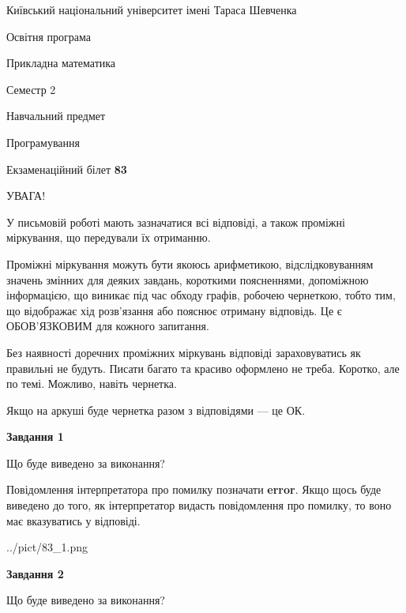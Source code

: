 \documentclass[12pt, ukrainian]{article}
\begin{document}
{{\begin {small}\par
{ \center  Київський національний університет імені Тараса Шевченка \par}
{\parbox {5 cm}{Освітня програма \hfill}{\parbox {7 cm}{Прикладна математика \hfill}}\parbox {6 cm}{\hfill Семестр 2}}\par
{\parbox {5 cm} {Навчальний предмет \hfill}\parbox {7 cm}{Програмування \hfill}\parbox {6cm}{\hfill}\par}\vspace{-7pt} \end{small}}{\center Екзаменаційний білет \No \textbf
{ 83 }\par}}
{
\begin {large}
УВАГА!

У письмовій роботі мають зазначатися всі відповіді, а також проміжні міркування, що передували їх отриманню.

Проміжні міркування можуть бути якоюсь арифметикою, відслідковуванням зна\-чень змінних для деяких завдань,
короткими поясненнями, допоміжною інформацією, що виникає під час обходу графів, робочею чернеткою,
тобто тим, що відображає хід розв’язання або пояснює отриману відповідь.
Це є ОБОВ’ЯЗКОВИМ для кожного запитання.

Без наявності доречних проміжних міркувань відповіді зараховуватись як правиль\-ні не будуть.
Писати багато та красиво оформлено не треба. Коротко, але по темі. Можли\-во, навіть чернетка.

Якщо на аркуші буде чернетка разом з відповідями --- це ОК.

\newpage

{\begin {center}\textbf{Завдання 1}\end {center}}\par
Що буде виведено за виконання?

Повідомлення інтерпретатора про помилку позначати \textbf{error}.
Якщо щось буде виведено до того, як інтерпретатор видасть повідомлення про помилку, 
то воно має вказуватись у відповіді. \par


\begin{center}
	{../pict/83_1.png}
\end{center}
\newpage

{\begin {center}\textbf{Завдання 2}\end {center}}\par
Що буде виведено за виконання?


\end{large}}
\end{document}
